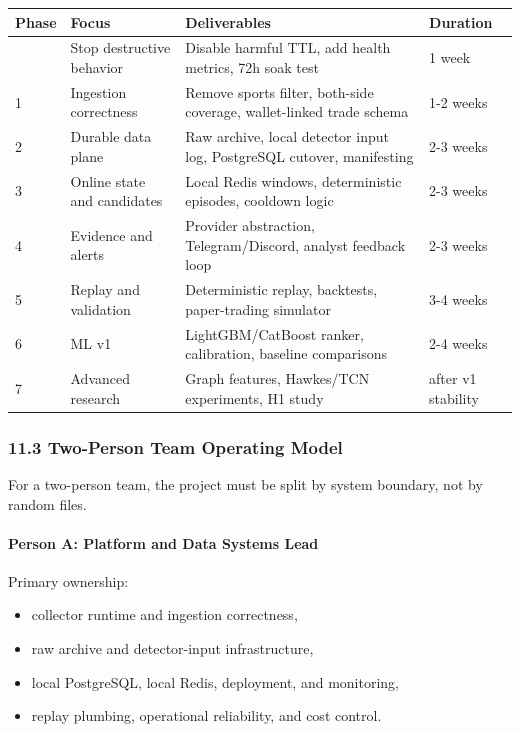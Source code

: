 \documentclass[
]{article}
\newcounter{none} %
\providecommand{\tightlist}{%
  \setlength{\itemsep}{0pt}\setlength{\parskip}{0pt}}
\begin{document}
{\def\LTcaptype{none} %
\begin{longtable}[]{@{}llll@{}}
\toprule\noalign{}
Phase & Focus & Deliverables & Duration \\
\midrule\noalign{}
\endhead
\bottomrule\noalign{}
\endlastfoot
0 & Stop destructive behavior & Disable harmful TTL, add health metrics,
72h soak test & 1 week \\
1 & Ingestion correctness & Remove sports filter, both-side coverage,
wallet-linked trade schema & 1-2 weeks \\
2 & Durable data plane & Raw archive, local detector input log,
PostgreSQL cutover,
manifesting & 2-3 weeks \\
3 & Online state and candidates & Local Redis windows, deterministic
episodes,
cooldown logic & 2-3 weeks \\
4 & Evidence and alerts & Provider abstraction, Telegram/Discord,
analyst feedback loop & 2-3 weeks \\
5 & Replay and validation & Deterministic replay, backtests,
paper-trading simulator & 3-4 weeks \\
6 & ML v1 & LightGBM/CatBoost ranker, calibration, baseline comparisons
& 2-4 weeks \\
7 & Advanced research & Graph features, Hawkes/TCN experiments, H1 study
& after v1 stability \\
\end{longtable}
}

\subsubsection{11.3 Two-Person Team Operating
Model}\label{113-two-person-team-operating-model}

For a two-person team, the project must be split by system boundary, not
by random files.

\paragraph{Person A: Platform and Data Systems
Lead}\label{person-a-platform-and-data-systems-lead}

Primary ownership:

\begin{itemize}
\tightlist
\item
  collector runtime and ingestion correctness,
\item
  raw archive and detector-input infrastructure,
\item
  local PostgreSQL, local Redis, deployment, and monitoring,
\item
  replay plumbing, operational reliability, and cost control.
\end{itemize}
\end{document}
